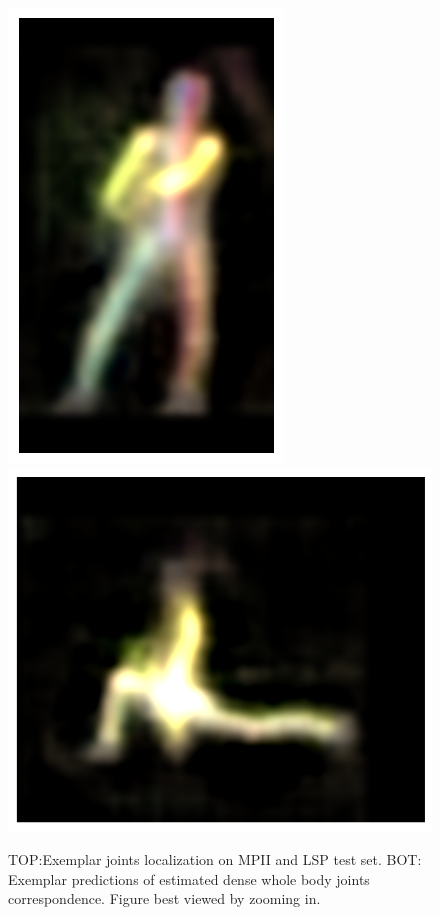 \begin{figure}[t!]
    \includegraphics[height=\flowhh]{resources/Human_Poses/qualitative/svs-11}
    \hfill
    \includegraphics[height=\flowhh]{resources/Human_Poses/qualitative/svs-12}

    
    \caption{TOP:Exemplar joints localization on MPII and LSP test set. BOT: Exemplar predictions of estimated dense whole body joints correspondence. Figure best viewed by zooming in.}
    \label{fig:qualitative_svs}
\end{figure}

